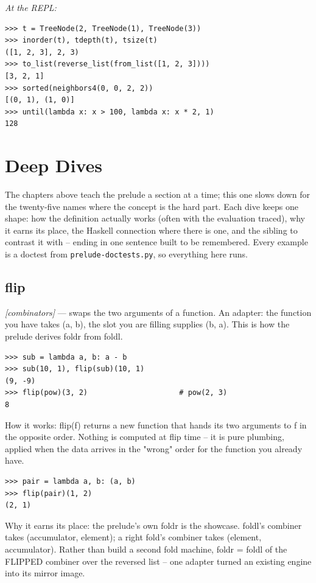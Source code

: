 \documentclass[11pt,letterpaper]{book}
\begin{document}
\noindent\textit{At the REPL:}
\begin{lstlisting}[style=spec]
>>> t = TreeNode(2, TreeNode(1), TreeNode(3))
>>> inorder(t), tdepth(t), tsize(t)
([1, 2, 3], 2, 3)
>>> to_list(reverse_list(from_list([1, 2, 3])))
[3, 2, 1]
>>> sorted(neighbors4(0, 0, 2, 2))
[(0, 1), (1, 0)]
>>> until(lambda x: x > 100, lambda x: x * 2, 1)
128
\end{lstlisting}
\chapter{Deep Dives}
The chapters above teach the prelude a section at a time; this one slows down
for the twenty-five names where the concept is the hard part. Each dive keeps
one shape: how the definition actually works (often with the evaluation
traced), why it earns its place, the Haskell connection where there is one,
and the sibling to contrast it with -- ending in one sentence built to be
remembered. Every example is a doctest from \texttt{prelude-doctests.py}, so
everything here runs.

\section{flip}
\noindent\textit{[combinators]} --- swaps the two arguments of a function. An adapter: the function you have takes (a, b), the slot you are filling supplies (b, a). This is how the prelude derives foldr from foldl.
\begin{lstlisting}[style=spec]
>>> sub = lambda a, b: a - b
>>> sub(10, 1), flip(sub)(10, 1)
(9, -9)
>>> flip(pow)(3, 2)                     # pow(2, 3)
8
\end{lstlisting}

How it works: flip(f) returns a new function that hands its two arguments to f in the opposite order. Nothing is computed at flip time -- it is pure plumbing, applied when the data arrives in the "wrong" order for the function you already have.

\begin{lstlisting}[style=spec]
>>> pair = lambda a, b: (a, b)
>>> flip(pair)(1, 2)
(2, 1)
\end{lstlisting}

Why it earns its place: the prelude's own foldr is the showcase. foldl's combiner takes (accumulator, element); a right fold's combiner takes (element, accumulator). Rather than build a second fold machine, foldr = foldl of the FLIPPED combiner over the reversed list -- one adapter turned an existing engine into its mirror image.
\end{document}
